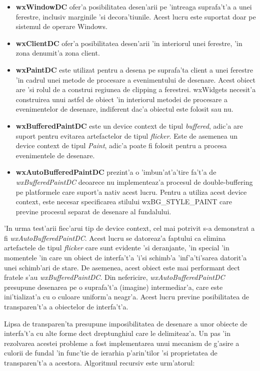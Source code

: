 \begin{itemize}
\item \textbf{wxWindowDC} ofer'a posibilitatea desen'arii pe 'intreaga suprafa't'a a unei ferestre, inclusiv marginile 'si decora'tiunile. Acest lucru este suportat doar pe sistemul de operare Windows.
\item \textbf{wxClientDC} ofer'a posibilitatea desen'arii 'in interiorul unei ferestre, 'in zona denumit'a zona client.
\item \textbf{wxPaintDC} este utilizat pentru a desena pe suprafa'ta client a unei ferestre 'in cadrul unei metode de procesare a evenimentului de desenare. Acest obiect are 'si rolul de a construi regiunea de clipping a ferestrei. wxWidgets necesit'a construirea unui astfel de obiect 'in interiorul metodei de procesare a evenimentelor de desenare, indiferent dac'a obiectul este folosit sau nu.
\item \textbf{wxBufferedPaintDC} este un device context de tipul \emph{buffered}, adic'a are suport pentru evitarea artefactelor de tipul \emph{flicker}. Este de asemenea un device context de tipul \emph{Paint}, adic'a poate fi folosit pentru a procesa evenimentele de desenare.
\item \textbf{wxAutoBufferedPaintDC} prezint'a o 'imbun'at'a'tire fa't'a de \emph{wxBufferedPaintDC} deoarece nu implementeaz'a procesul de double-buffering pe platformele care suport'a nativ acest lucru. Pentru a utiliza acest device context, este necesar specificarea stilului wxBG\_STYLE\_PAINT care previne procesul separat de desenare al fundalului.
\end{itemize}

'In urma test'arii fiec'arui tip de device context, cel mai potrivit s-a demonstrat a fi \emph{wxAutoBufferedPaintDC}. Acest lucru se datoreaz'a faptului ca elimina artefactele de tipul \emph{flicker} care sunt evidente 'si deranjante, 'in special 'in momentele 'in care un obiect de interfa't'a 'i'si schimb'a 'inf'a'ti'sarea datorit'a unei schimb'ari de stare. De asemenea, acest obiect este mai performant dec{\ia}t fratele s'au \emph{wxBufferedPaintDC}. Din nefericire, \emph{wxAutoBufferedPaintDC} presupune desenarea pe o suprafa't'a (imagine) intermediar'a, care este ini'tializat'a cu o culoare uniform'a neagr'a. Acest lucru previne posibilitatea de transparen't'a a obiectelor de interfa't'a. 

Lipsa de transparen'ta presupune imposibilitatea de desenare a unor obiecte de interfa't'a cu alte forme dec{\ia}t dreptunghiul care le delimiteaz'a. Un pas 'in rezolvarea acestei probleme a fost implementarea unui mecanism de g'asire a culorii de fundal 'in func'tie de ierarhia p'arin'tilor 'si proprietatea de transparen't'a a acestora. Algoritmul recursiv este urm'atorul:

